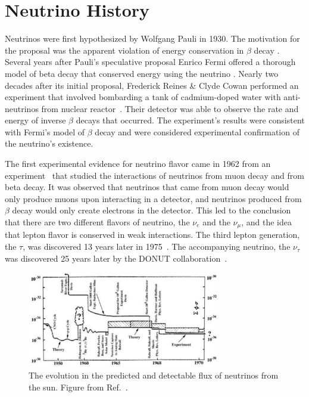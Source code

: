 \section{Neutrino History}
Neutrinos were first hypothesized by Wolfgang Pauli in 1930.
The motivation for the proposal was the apparent violation of energy
conservation in $\beta$ decay \citep{pauli_letter}.
Several years after Pauli's speculative proposal Enrico Fermi offered
a thorough model of beta decay that conserved energy using the neutrino
\citep{fermi_beta_decay}.
Nearly two decades after its initial proposal, Frederick Reines \&
Clyde Cowan performed an experiment that involved bombarding a tank of
cadmium-doped water with anti-neutrinos from nuclear
reactor~\citep{cowan_reines}.
Their detector was able to observe the rate and energy of inverse $\beta$
decays that occurred.
The experiment's results were consistent with Fermi's model of $\beta$ decay and were
considered experimental confirmation of the neutrino's existence.

The first experimental evidence for neutrino flavor came in 1962 from an
experiment~\citep{lederman_muon_flavor} that studied the interactions of
neutrinos from muon decay and 
from beta decay.
It was observed that neutrinos that came from muon decay would only produce
muons upon interacting in a detector,
and neutrinos produced from $\beta$ decay would only create electrons in the
detector.
This led to the conclusion that there are two different flavors of neutrino,
the $\nu_e$ and the $\nu_{\mu}$, and the idea that lepton flavor is conserved in
weak interactions.
The third lepton generation, the $\tau$, was discovered 13
years later in 1975~\citep{tau_discovery}. The accompanying neutrino, the $\nu_\tau$
was discovered 25 years later by the DONUT collaboration~\cite{donut}.

\begin{figure}[htbp]
\centering
\includegraphics[width=0.75\textwidth]{bahcall_evolution}
\caption[Evolution of Solar Neutrino Predictions and Observations]{
The evolution in the predicted and detectable flux of neutrinos from the sun.
Figure from Ref.~\citep{bahcall_evolution}.}
\label{fig:solar_evolution_cartoon}
\end{figure}

